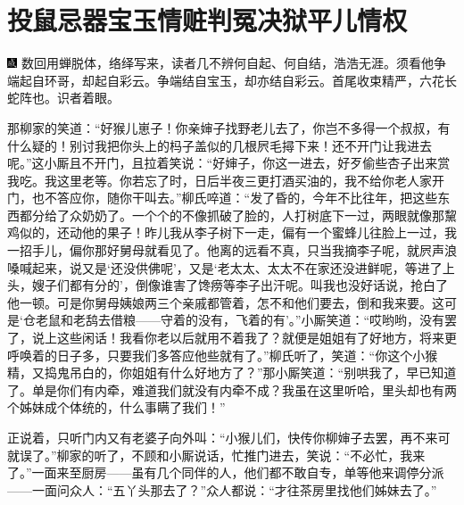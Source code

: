 

\chapter{投鼠忌器宝玉情赃\hspace{.5em}判冤决狱平儿情权}

{\includegraphics[width=3mm]{../Images/00005} \kaishu 数回用蝉脱体，络绎写来，读者几不辨何自起、何自结，浩浩无涯。须看他争端起自环哥，却起自彩云。争端结自宝玉，却亦结自彩云。首尾收束精严，六花长蛇阵也。识者着眼。}

那柳家的笑道：``好猴儿崽子！你亲婶子找野老儿去了，你岂不多得一个叔叔，有什么疑的！别讨我把你头上的杩子盖似的几根屄毛撏下来！还不开门让我进去呢。''这小厮且不开门，且拉着笑说：``好婶子，你这一进去，好歹偷些杏子出来赏我吃。我这里老等。你若忘了时，日后半夜三更打酒买油的，我不给你老人家开门，也不答应你，随你干叫去。''柳氏啐道：``发了昏的，今年不比往年，把这些东西都分给了众奶奶了。一个个的不像抓破了脸的，人打树底下一过，两眼就像那黧鸡似的，还动他的果子！昨儿我从李子树下一走，偏有一个蜜蜂儿往脸上一过，我一招手儿，偏你那好舅母就看见了。他离的远看不真，只当我摘李子呢，就屄声浪嗓喊起来，说又是`还没供佛呢'，又是`老太太、太太不在家还没进鲜呢，等进了上头，嫂子们都有分的'，倒像谁害了馋痨等李子出汗呢。叫我也没好话说，抢白了他一顿。可是你舅母姨娘两三个亲戚都管着，怎不和他们要去，倒和我来要。这可是`仓老鼠和老鸹去借粮------守着的没有，飞着的有'。''小厮笑道：``哎哟哟，没有罢了，说上这些闲话！我看你老以后就用不着我了？就便是姐姐有了好地方，将来更呼唤着的日子多，只要我们多答应他些就有了。''柳氏听了，笑道：``你这个小猴精，又捣鬼吊白的，你姐姐有什么好地方了？''那小厮笑道：``别哄我了，早已知道了。单是你们有内牵，难道我们就没有内牵不成？我虽在这里听哈，里头却也有两个姊妹成个体统的，什么事瞒了我们！''

正说着，只听门内又有老婆子向外叫：``小猴儿们，快传你柳婶子去罢，再不来可就误了。''柳家的听了，不顾和小厮说话，忙推门进去，笑说：``不必忙，我来了。''一面来至厨房------虽有几个同伴的人，他们都不敢自专，单等他来调停分派------一面问众人：``五丫头那去了？''众人都说：``才往茶房里找他们姊妹去了。''

